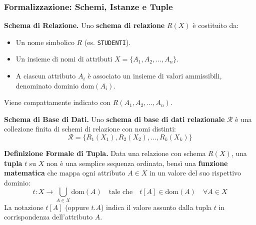 \documentclass[12pt]{extarticle}
\begin{document}
\subsubsection{Formalizzazione: Schemi, Istanze e Tuple}
\noindent \textbf{Schema di Relazione.} Uno \textbf{schema di relazione} $R(X)$ è costituito da:
\begin{itemize}
    \item Un nome simbolico $R$ (es. \texttt{STUDENTI}).
    \item Un insieme di nomi di attributi $X = \{A_1, A_2, \dots, A_n\}$.
    \item A ciascun attributo $A_i$ è associato un insieme di valori ammissibili, denominato dominio $\text{dom}(A_i)$.
\end{itemize}
Viene compattamente indicato con $R(A_1, A_2, \dots, A_n)$.

\medskip
\noindent \textbf{Schema di Base di Dati.} Uno \textbf{schema di base di dati relazionale} $\mathcal{R}$ è una collezione finita di schemi di relazione con nomi distinti:
$$\mathcal{R} = \{ R_1(X_1), R_2(X_2), \dots, R_k(X_k) \}$$

\medskip
\noindent \textbf{Definizione Formale di Tupla.} Data una relazione con schema $R(X)$, una \textbf{tupla} $t$ su $X$ non è una semplice sequenza ordinata, bensì una \textbf{funzione matematica} che mappa ogni attributo $A \in X$ in un valore del suo rispettivo dominio:
$$t: X \longrightarrow \bigcup_{A \in X} \text{dom}(A) \quad \text{tale che} \quad t[A] \in \text{dom}(A) \quad \forall A \in X$$
La notazione $t[A]$ (oppure $t.A$) indica il valore assunto dalla tupla $t$ in corrispondenza dell'attributo $A$.
\end{document}

